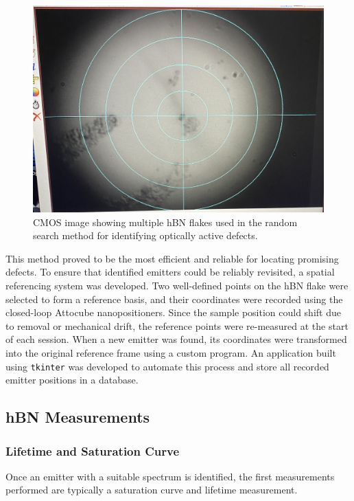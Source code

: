 \begin{figure}[h]
    \centering
    \includegraphics[width=0.75\linewidth]{Figures/CMOS-vis.jpg}
    \caption{CMOS image showing multiple hBN flakes used in the random search method for identifying optically active defects.}
    \label{fig:CMOS-vis}
\end{figure}

This method proved to be the most efficient and reliable for locating promising defects. To ensure that identified emitters could be reliably revisited, a spatial referencing system was developed. Two well-defined points on the hBN flake were selected to form a reference basis, and their coordinates were recorded using the closed-loop Attocube nanopositioners. Since the sample position could shift due to removal or mechanical drift, the reference points were re-measured at the start of each session. When a new emitter was found, its coordinates were transformed into the original reference frame using a custom program. An application built using \texttt{tkinter} was developed to automate this process and store all recorded emitter positions in a database.


\subsection{hBN Measurements}

\subsubsection{Lifetime and Saturation Curve}

Once an emitter with a suitable spectrum is identified, the first measurements performed are typically a saturation curve and lifetime measurement.

